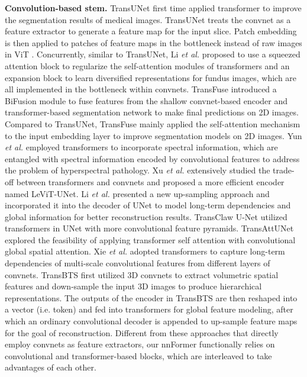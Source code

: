 \documentclass[journal,twoside,web]{ieeecolor}
\newcommand{\etal}{\textit{et al.}}
\begin{document}
\noindent \textbf{Convolution-based stem.} TransUNet \cite{chen2021transunet} first time applied transformer to improve the segmentation results of medical images. TransUNet treats the convnet as a feature extractor to generate a feature map for the input slice. Patch embedding is then applied to patches of feature maps in the bottleneck instead of raw images in ViT \cite{dosovitskiy2020image}. Concurrently, similar to TransUNet, Li \etal \cite{li2021medical} proposed to use a squeezed attention block to regularize the self-attention modules of transformers and an expansion block to learn diversified representations for fundus images, which are all implemented in the bottleneck within convnets. TransFuse \cite{zhang2021transfuse} introduced a BiFusion module to fuse features from the shallow convnet-based encoder and transformer-based segmentation network to make final predictions on 2D images. Compared to TransUNet, TransFuse mainly applied the self-attention mechanism to the input embedding layer to improve segmentation models on 2D images. Yun \etal \cite{yun2021spectr} employed transformers to incorporate spectral information, which are entangled with spectral information encoded by convolutional features to address the problem of hyperspectral pathology. Xu \etal \cite{xu2021levit} extensively studied the trade-off between transformers and convnets and proposed a more efficient encoder named LeViT-UNet. Li \etal \cite{li2021more} presented a new up-sampling approach and incorporated it into the decoder of UNet to model long-term dependencies and global information for better reconstruction results. TransClaw U-Net \cite{chang2021transclaw} utilized transformers in UNet with more convolutional feature pyramids. TransAttUNet \cite{chen2021transattunet} explored the feasibility of applying transformer self attention with convolutional global spatial attention. Xie \etal \cite{xie2021cotr} adopted transformers to capture long-term dependencies of multi-scale convolutional features from different layers of convnets. TransBTS \cite{wang2021transbts} first utilized 3D convnets to extract volumetric spatial features and down-sample the input 3D images to produce hierarchical representations. The outputs of the encoder in TransBTS are then reshaped into a vector (i.e. token) and fed into transformers for global feature modeling, after which an ordinary convolutional decoder is appended to up-sample feature maps for the goal of reconstruction. Different from these approaches that directly employ convnets as feature extractors, our nnFormer functionally relies on convolutional and transformer-based blocks, which are interleaved to take advantages of each other.\\
\end{document}
